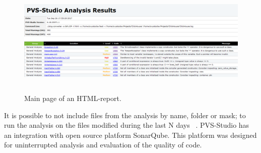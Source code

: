 \begin{figure}[h]
	\centering
	\includegraphics[height=53mm]{figures/pvs.png}
	\caption{Main page of an HTML-report.}
	\label{fig:pvs}
\end{figure}

It is possible to not include files from the analysis by name, folder or mask; to run the analysis on the files modified during the last N days ~\cite{pvs}. PVS-Studio has an integration with open source platform SonarQube. This platform was designed for uninterrupted analysis and evaluation of the quality of code.